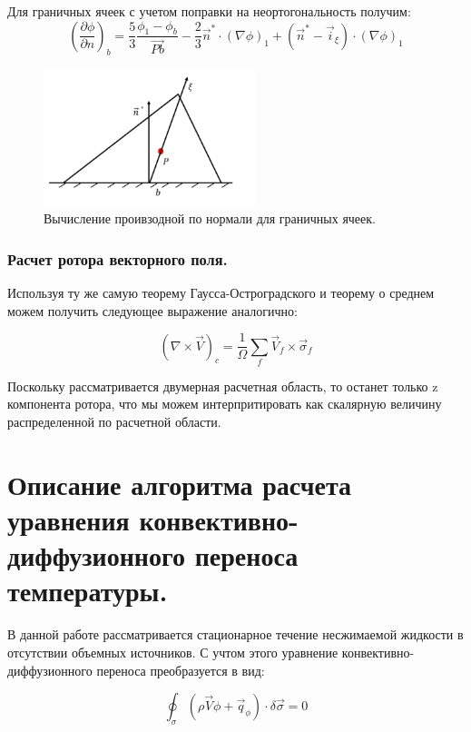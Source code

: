 Для граничных ячеек с учетом поправки на неортогональность получим:
\begin{equation}
    (\frac{\partial\phi}{\partial n})_b =\frac{5}{3}\frac{\phi_1-\phi_b}{\vec{Pb}}-\frac{2}{3}\vec{n}^*\cdot({\nabla\phi})_1+(\vec{n}^*-\vec{i}_\xi)\cdot(\nabla\phi)_1
\end{equation}
\begin{figure}[H]
    \centering
    \includegraphics[width=0.55\textwidth]{img/8.png}
    \caption{Вычисление проивзодной по нормали для граничных ячеек.}
    \label{fig:8}
\end{figure}


\subsubsection{Расчет ротора векторного поля.}

Используя ту же самую теорему Гаусса-Остроградского и теорему о среднем можем получить следующее выражение аналогично:

\begin{equation}
    (\nabla\times\vec{V})_c = \frac{1}{\Omega}\sum_f\vec{V}_f\times\vec{\sigma}_f
\end{equation}

Поскольку рассматривается двумерная расчетная область, то останет только z компонента ротора, что мы можем интерпритировать как скалярную величину распределенной по расчетной области.


\section{Описание алгоритма расчета уравнения конвективно-диффузионного переноса температуры.}
В данной работе рассматривается стационарное течение несжимаемой жидкости в отсутствии объемных источников. С учтом этого уравнение конвективно-диффузионного переноса преобразуется в вид:

\begin{equation}
    \oint_\sigma(\rho\vec{V}\phi+\vec{q}_\phi)\cdot\delta\vec{\sigma} =0
\end{equation}

